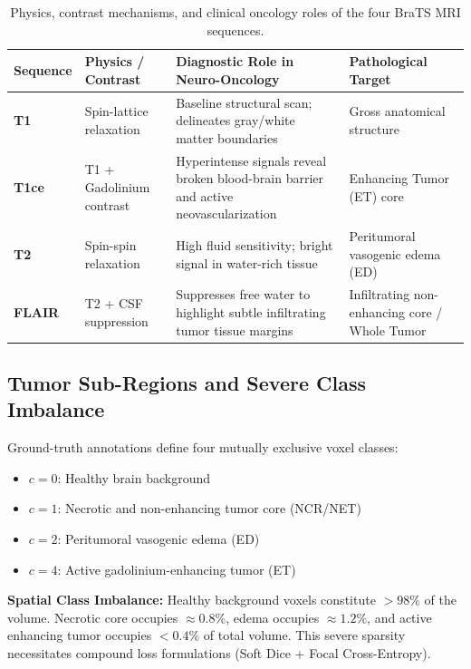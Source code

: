 \documentclass[10pt,a4paper]{article}
\begin{document}
\begin{table}[h]
\centering
\small
\renewcommand{\arraystretch}{1.15}
\begin{tabularx}{\textwidth}{l p{3.2cm} p{5.5cm} X}
\toprule
\textbf{Sequence} & \textbf{Physics / Contrast} & \textbf{Diagnostic Role in Neuro-Oncology} & \textbf{Pathological Target} \\
\midrule
\textbf{T1} & Spin-lattice relaxation & Baseline structural scan; delineates gray/white matter boundaries & Gross anatomical structure \\
\textbf{T1ce} & T1 + Gadolinium contrast & Hyperintense signals reveal broken blood-brain barrier and active neovascularization & Enhancing Tumor (ET) core \\
\textbf{T2} & Spin-spin relaxation & High fluid sensitivity; bright signal in water-rich tissue & Peritumoral vasogenic edema (ED) \\
\textbf{FLAIR} & T2 + CSF suppression & Suppresses free water to highlight subtle infiltrating tumor tissue margins & Infiltrating non-enhancing core / Whole Tumor \\
\bottomrule
\end{tabularx}
\caption{Physics, contrast mechanisms, and clinical oncology roles of the four BraTS MRI sequences.}
\label{tab:modalities}
\end{table}

\subsection{Tumor Sub-Regions and Severe Class Imbalance}
Ground-truth annotations define four mutually exclusive voxel classes:
\begin{itemize}[itemsep=1pt, topsep=1pt]
    \item $c = 0$: Healthy brain background
    \item $c = 1$: Necrotic and non-enhancing tumor core (NCR/NET)
    \item $c = 2$: Peritumoral vasogenic edema (ED)
    \item $c = 4$: Active gadolinium-enhancing tumor (ET)
\end{itemize}
\noindent \textbf{Spatial Class Imbalance:} Healthy background voxels constitute $>98\%$ of the volume. Necrotic core occupies $\approx 0.8\%$, edema occupies $\approx 1.2\%$, and active enhancing tumor occupies $<0.4\%$ of total volume. This severe sparsity necessitates compound loss formulations (Soft Dice + Focal Cross-Entropy).
\end{document}
